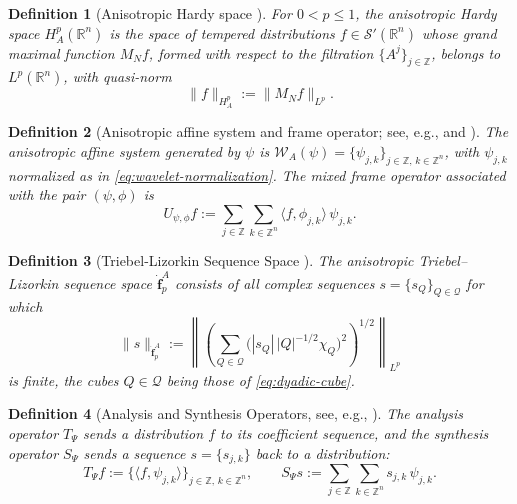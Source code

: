\documentclass[pdflatex,sn-basic,Numbered]{sn-jnl}
\theoremstyle{thmstyleone}%
\theoremstyle{thmstylethree}%
\newtheorem{definition}{Definition}%
\begin{document}
\begin{definition}[{Anisotropic Hardy space \cite[Definition 3.11]{Bownik2003}}]\label{def:hardy-space}
	For $0 < p \le 1$, the anisotropic Hardy space $H^p_A(\mathbb{R}^n)$ is the
	space of tempered distributions $f \in \mathcal{S}'(\mathbb{R}^n)$ whose grand
	maximal function $M_N f$, formed with respect to the filtration
	$\{A^j\}_{j \in \mathbb{Z}}$, belongs to $L^p(\mathbb{R}^n)$, with quasi-norm
	\begin{equation}\label{eq:hardy-norm}
		\|f\|_{H^p_A} := \| M_N f \|_{L^p} .
	\end{equation}
\end{definition}




\begin{definition}[{Anisotropic affine system and frame operator; see, e.g., \cite[Chapter 2]{Bownik2003} and \cite[Section 6.2]{Christensen2016}}]\label{def:affine-system}
	The anisotropic affine system generated by $\psi$ is
	$\mathcal{W}_A(\psi) = \{\psi_{j,k}\}_{j \in \mathbb{Z},\, k \in \mathbb{Z}^n}$,
	with $\psi_{j,k}$ normalized as in \eqref{eq:wavelet-normalization}. The mixed
	frame operator associated with the pair $(\psi,\phi)$ is
	\begin{equation}\label{eq:frame-operator}
		U_{\psi,\phi} f := \sum_{j \in \mathbb{Z}} \sum_{k \in \mathbb{Z}^n}
		\langle f, \phi_{j,k} \rangle\, \psi_{j,k} .
	\end{equation}
\end{definition}


\begin{definition}[{Triebel-Lizorkin Sequence Space \cite[Definition 3.1]{Bownik2007}}]\label{def:sequence-space}
	The anisotropic Triebel--Lizorkin sequence space $\dot{\mathbf{f}}^A_p$
	consists of all complex sequences $s = \{s_Q\}_{Q \in \mathcal{Q}}$ for which
	\begin{equation}\label{eq:sequence-norm}
		\|s\|_{\dot{\mathbf{f}}^A_p}
		:= \left\| \left( \sum_{Q \in \mathcal{Q}}
		\bigl( |s_Q|\, |Q|^{-1/2} \chi_Q \bigr)^2 \right)^{1/2}
		\right\|_{L^p}
	\end{equation}
	is finite, the cubes $Q \in \mathcal{Q}$ being those of \eqref{eq:dyadic-cube}.
\end{definition}


\begin{definition}[{Analysis and Synthesis Operators, see, e.g., \cite[Section 3]{Bownik2007}}]\label{def:analysis-synthesis}
	The analysis operator $T_\Psi$ sends a distribution $f$ to its coefficient
	sequence, and the synthesis operator $S_\Psi$ sends a sequence
	$s = \{s_{j,k}\}$ back to a distribution:
	\begin{equation}\label{eq:analysis-synthesis}
		T_\Psi f := \bigl\{ \langle f, \psi_{j,k} \rangle \bigr\}_{j \in \mathbb{Z},\, k \in \mathbb{Z}^n},
		\qquad
		S_\Psi s := \sum_{j \in \mathbb{Z}} \sum_{k \in \mathbb{Z}^n} s_{j,k}\, \psi_{j,k} .
	\end{equation}
\end{definition}
\end{document}
